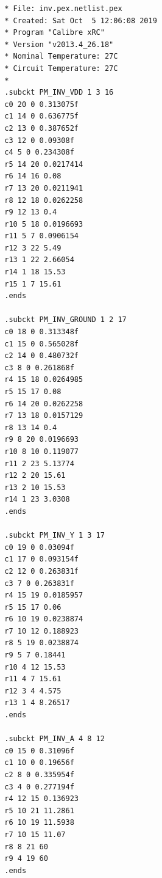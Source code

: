\documentclass[11pt]{article}
\begin{document}
	\begin{lstlisting}
		* File: inv.pex.netlist.pex
		* Created: Sat Oct  5 12:06:08 2019
		* Program "Calibre xRC"
		* Version "v2013.4_26.18"
		* Nominal Temperature: 27C
		* Circuit Temperature: 27C
		* 
		.subckt PM_INV_VDD 1 3 16
		c0 20 0 0.313075f
		c1 14 0 0.636775f
		c2 13 0 0.387652f
		c3 12 0 0.09308f
		c4 5 0 0.234308f
		r5 14 20 0.0217414
		r6 14 16 0.08
		r7 13 20 0.0211941
		r8 12 18 0.0262258
		r9 12 13 0.4
		r10 5 18 0.0196693
		r11 5 7 0.0906154
		r12 3 22 5.49
		r13 1 22 2.66054
		r14 1 18 15.53
		r15 1 7 15.61
		.ends
		
		.subckt PM_INV_GROUND 1 2 17
		c0 18 0 0.313348f
		c1 15 0 0.565028f
		c2 14 0 0.480732f
		c3 8 0 0.261868f
		r4 15 18 0.0264985
		r5 15 17 0.08
		r6 14 20 0.0262258
		r7 13 18 0.0157129
		r8 13 14 0.4
		r9 8 20 0.0196693
		r10 8 10 0.119077
		r11 2 23 5.13774
		r12 2 20 15.61
		r13 2 10 15.53
		r14 1 23 3.0308
		.ends
		
		.subckt PM_INV_Y 1 3 17
		c0 19 0 0.03094f
		c1 17 0 0.093154f
		c2 12 0 0.263831f
		c3 7 0 0.263831f
		r4 15 19 0.0185957
		r5 15 17 0.06
		r6 10 19 0.0238874
		r7 10 12 0.188923
		r8 5 19 0.0238874
		r9 5 7 0.18441
		r10 4 12 15.53
		r11 4 7 15.61
		r12 3 4 4.575
		r13 1 4 8.26517
		.ends
		
		.subckt PM_INV_A 4 8 12
		c0 15 0 0.31096f
		c1 10 0 0.19656f
		c2 8 0 0.335954f
		c3 4 0 0.277194f
		r4 12 15 0.136923
		r5 10 21 11.2861
		r6 10 19 11.5938
		r7 10 15 11.07
		r8 8 21 60
		r9 4 19 60
		.ends
			
	\end{lstlisting}
\end{document}
